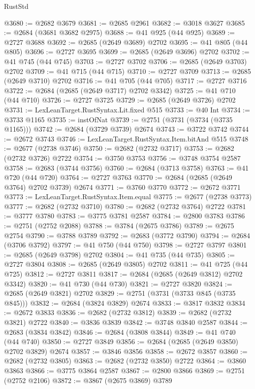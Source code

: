 \begin{lexlean}{RustStd}
\begin{coremodule}
@3680 := @2682 @3679
@3681 := @2685 @2961
@3682 := @3018 @3627
@3685 := @2684 (@3681 @3682 @2975)
@3688 := @41 @925 (@44 @925)
@3689 := @2727 @3688
@3692 := @2685 (@2649 @3689) @2702
@3695 := @41 @805 (@44 @805)
@3696 := @2727 @3695
@3699 := @2685 (@2649 @3696) @2702
@3702 := @41 @745 (@44 @745)
@3703 := @2727 @3702
@3706 := @2685 (@2649 @3703) @2702
@3709 := @41 @715 (@44 @715)
@3710 := @2727 @3709
@3713 := @2685 (@2649 @3710) @2702
@3716 := @41 @705 (@44 @705)
@3717 := @2727 @3716
@3722 := @2684 (@2685 (@2649 @3717) @2702 @3342)
@3725 := @41 @710 (@44 @710)
@3726 := @2727 @3725
@3729 := @2685 (@2649 @3726) @2702
@3731 := LexLeanTarget.RustSyntax.Lit.fixed @515
@3733 := @40 Int
@3734 := @3733 @1165
@3735 := instOfNat
@3739 := @2751 (@3731 (@3734 (@3735 @1165)))
@3742 := @2684 (@3729 @3739) @2674
@3743 := @3722 @3742
@3744 := @2672 @3743
@3746 := LexLeanTarget.RustSyntax.Item.bitAnd @515
@3748 := @2677 (@2738 @3746)
@3750 := @2682 (@2732 @3717)
@3753 := @2682 (@2732 @3726) @2722
@3754 := @3750 @3753
@3756 := @3748 @3754 @2587
@3758 := @2683 (@3744 @3756)
@3760 := @2684 (@3713 @3758)
@3763 := @41 @720 (@44 @720)
@3764 := @2727 @3763
@3770 := @2684 (@2685 (@2649 @3764) @2702 @3739) @2674
@3771 := @3760 @3770
@3772 := @2672 @3771
@3773 := LexLeanTarget.RustSyntax.Item.equal
@3775 := @2677 (@2738 @3773)
@3777 := @2682 (@2732 @3710)
@3780 := @2682 (@2732 @3764) @2722
@3781 := @3777 @3780
@3783 := @3775 @3781 @2587
@3784 := @2800 @3783
@3786 := @2751 (@2752 @2088)
@3788 := @3784 (@2675 @3786)
@3789 := @2675 @2754
@3790 := @3788 @3789
@3792 := @2683 (@3772 @3790)
@3794 := @2684 (@3706 @3792)
@3797 := @41 @750 (@44 @750)
@3798 := @2727 @3797
@3801 := @2685 (@2649 @3798) @2702
@3804 := @41 @735 (@44 @735)
@3805 := @2727 @3804
@3808 := @2685 (@2649 @3805) @2702
@3811 := @41 @725 (@44 @725)
@3812 := @2727 @3811
@3817 := @2684 (@2685 (@2649 @3812) @2702 @3342)
@3820 := @41 @730 (@44 @730)
@3821 := @2727 @3820
@3824 := @2685 (@2649 @3821) @2702
@3829 := @2751 (@3731 (@3733 @845 (@3735 @845)))
@3832 := @2684 (@3824 @3829) @2674
@3833 := @3817 @3832
@3834 := @2672 @3833
@3836 := @2682 (@2732 @3812)
@3839 := @2682 (@2732 @3821) @2722
@3840 := @3836 @3839
@3842 := @3748 @3840 @2587
@3844 := @2683 (@3834 @3842)
@3846 := @2684 (@3808 @3844)
@3849 := @41 @740 (@44 @740)
@3850 := @2727 @3849
@3856 := @2684 (@2685 (@2649 @3850) @2702 @3829) @2674
@3857 := @3846 @3856
@3858 := @2672 @3857
@3860 := @2682 (@2732 @3805)
@3863 := @2682 (@2732 @3850) @2722
@3864 := @3860 @3863
@3866 := @3775 @3864 @2587
@3867 := @2800 @3866
@3869 := @2751 (@2752 @2106)
@3872 := @3867 (@2675 @3869) @3789

\end{coremodule}
\end{lexlean}
